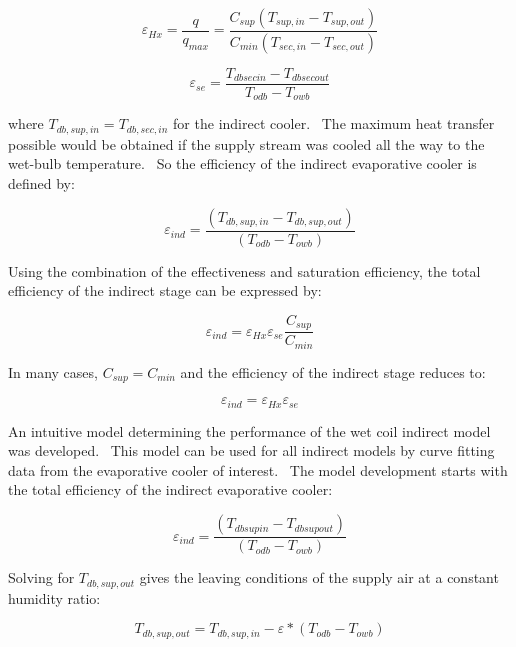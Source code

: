 \begin{equation}
{\varepsilon_{Hx}} = \frac{q}{{{q_{max}}}} = \frac{{{C_{sup}}({T_{sup,in}} - {T_{sup,out}})}}{{{C_{min}}({T_{sec,in}} - {T_{sec,out}})}}
\end{equation}

\begin{equation}
{\varepsilon_{se}} = \frac{{T_{dbsecin}} - {T_{dbsecout}}}{{T_{odb}} - {T_{owb}}}
\end{equation}

where \(T_{db,sup,in} = T_{db,sec,in}\) for the indirect cooler.~ The maximum heat transfer possible would be obtained if the supply stream was cooled all the way to the wet-bulb temperature.~ So the efficiency of the indirect evaporative cooler is defined by:

\begin{equation}
{\varepsilon_{ind}} = \frac{{({T_{db,sup,in}} - {T_{db,sup,out}})}}{{({T_{odb}} - {T_{owb}})}}
\end{equation}

Using the combination of the effectiveness and saturation efficiency, the total efficiency of the indirect stage can be expressed by:

\begin{equation}
{\varepsilon_{ind}} = {\varepsilon_{Hx}} {\varepsilon_{se}} \frac{C_{sup}}{C_{min}}
\end{equation}

In many cases, \(C_{sup} = C_{min}\) and the efficiency of the indirect stage reduces to:

\begin{equation}
{\varepsilon_{ind}} = {\varepsilon_{Hx}} {\varepsilon_{se}}
\end{equation}

An intuitive model determining the performance of the wet coil indirect model was developed.~ This model can be used for all indirect models by curve fitting data from the evaporative cooler of interest.~ The model development starts with the total efficiency of the indirect evaporative cooler:

\begin{equation}
{\varepsilon_{ind}} = \frac{({T_{dbsupin}} - {T_{dbsupout}})}{({T_{odb}} - {T_{owb}})}
\end{equation}

Solving for \(T_{db,sup,out}\) gives the leaving conditions of the supply air at a constant humidity ratio:

\begin{equation}
{T_{db,sup,out}} = {T_{db,sup,in}} - \varepsilon * ({T_{odb}}-{T_{owb}})
\end{equation}


